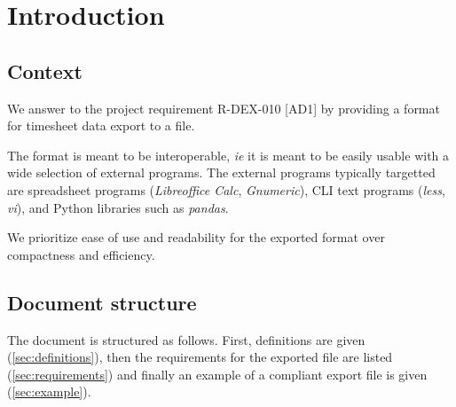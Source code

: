 \section{Introduction}
\subsection{Context}
We answer to the project requirement R-DEX-010 [AD1] by providing a format
for timesheet data export to a file.

The format is meant to be interoperable, \textit{ie} it is meant to be
easily usable with a wide selection of external programs. The external
programs typically targetted are spreadsheet programs (\emph{Libreoffice Calc},
\emph{Gnumeric}), \gls{CLI} text programs (\emph{less}, \emph{vi}),
and Python libraries such as \emph{pandas}.

We prioritize ease of use and readability for the exported format over
compactness and efficiency.

\subsection{Document structure}
The document is structured as follows. First, definitions are given
(\cref{sec:definitions}), then the requirements for the exported file
are listed (\cref{sec:requirements}) and finally an example of a compliant
export file is given (\cref{sec:example}).
